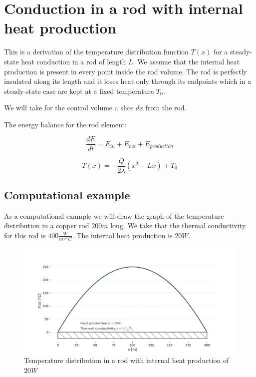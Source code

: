 \documentclass[10pt]{article}
\begin{document}
\setlength{\parskip}{0.6em}
\setlength{\parindent}{0cm}

\section*{Conduction in a rod with internal heat production}

This is a derivation of the temperature distribution function $T(x)$ for a steady-state heat conduction in a rod of length $L$. We assume that the internal heat production is present in every point inside the rod volume. The rod is perfectly insulated along its length and it loses heat only through its endpoints which in a steady-state case are kept at a fixed temperature $T_0$.

We will take for the control volume a slice $dx$ from the rod.

The energy balance for the rod element:

\begin{equation}
\frac{dE}{dt} = E_{in} + E_{out} + E_{production}
\end{equation}

\begin{equation}
T(x) = - \frac{Q}{2 \lambda} (x^2 - Lx) + T_0
\label{eq:solution}
\end{equation}


\subsection*{Computational example}

As a computational example we will draw the graph of the temperature distribution in a copper rod $200 m$ long. We take that the thermal conductivity for this rod is $400 \frac{W}{m \cdot ^o C}$. The internal heat production is $20 W$.

\begin{figure}[H]
\centering\includegraphics[width=18cm]{temperature_distribution.png}
\caption{Temperature distribution in a rod with internal heat production of $20 W$}
\label{fig:learning_curve}
\end{figure}
\end{document}
